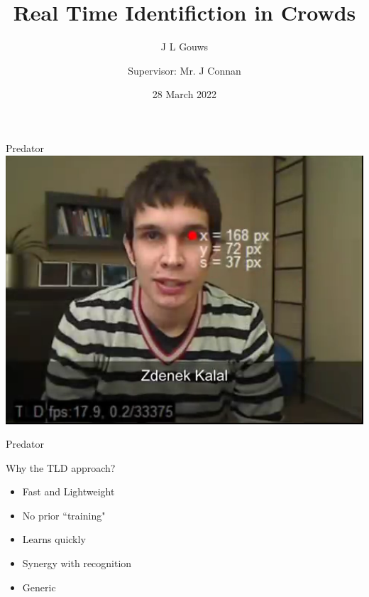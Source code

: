 \documentclass[mathserif]{beamer}
\title{Real Time Identifiction in Crowds}
\subtitle{}
\author[Gouws]{J L Gouws\inst{1}\\[1ex]  \and {\small Supervisor: Mr. J Connan\inst{1}}}
\date{28 March 2022}
\institute[RU]{\inst{1} Rhodes University}
\begin{document}
\begin{frame}
   \maketitle
\end{frame}

\begin{frame}{Predator\cite{PredatorVid}}
\centering
  \includegraphics[width=1.0\textwidth]{predatorcutThumb.png}
\end{frame}
\begin{frame}{Predator \cite{PredatorVid}}
\centering
\end{frame}

\begin{frame}{Why the TLD approach?}
    \begin{itemize}
      \setlength\itemsep{1em}
       \item \hspace{0pt}
          \pause Fast and Lightweight
       \item \hspace{0pt}
          \pause No prior ``training"
       \item \hspace{0pt}
          \pause Learns quickly
       \item \hspace{0pt}
          \pause Synergy with recognition
       \item \hspace{0pt}
          \pause Generic
    \end{itemize}

\end{frame}
\end{document}
